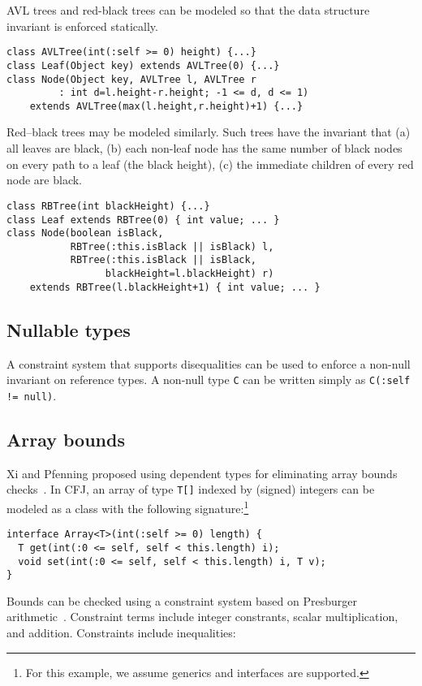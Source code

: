 AVL trees and red-black trees can be modeled so that the
data structure invariant is enforced statically.

{\footnotesize
\begin{verbatim}
class AVLTree(int(:self >= 0) height) {...}
class Leaf(Object key) extends AVLTree(0) {...}
class Node(Object key, AVLTree l, AVLTree r
         : int d=l.height-r.height; -1 <= d, d <= 1) 
    extends AVLTree(max(l.height,r.height)+1) {...}
\end{verbatim}}

Red--black trees may be modeled similarly. Such trees have the
invariant that (a) all leaves are black, (b) each non-leaf node has
the same number of black nodes on every path to a leaf (the black
height), (c) the immediate children of every red node are black.
{\footnotesize
\begin{verbatim}
class RBTree(int blackHeight) {...}
class Leaf extends RBTree(0) { int value; ... }
class Node(boolean isBlack, 
           RBTree(:this.isBlack || isBlack) l, 
           RBTree(:this.isBlack || isBlack,
                 blackHeight=l.blackHeight) r)
    extends RBTree(l.blackHeight+1) { int value; ... }
\end{verbatim}}

\subsection{Nullable types}

A constraint system that supports disequalities can be used to
enforce a non-null invariant on reference types.
A non-null type {\tt C} can be written simply as {\tt C(:self != null)}.

\subsection{Array bounds}

Xi and Pfenning proposed using dependent types for eliminating
array bounds checks~\cite{xi98array}.
In CFJ, an array of type {\tt T[]} indexed by (signed) integers
can be modeled as a class with the following
signature:\footnote{For this example, we assume generics and
interfaces are supported.}
\begin{verbatim}
interface Array<T>(int(:self >= 0) length) {
  T get(int(:0 <= self, self < this.length) i);
  void set(int(:0 <= self, self < this.length) i, T v);
}
\end{verbatim}

Bounds can be checked using a constraint system based on
Presburger arithmetic~\cite{omega}.  Constraint terms include
integer constrants, scalar multiplication, and addition.
Constraints include inequalities:

